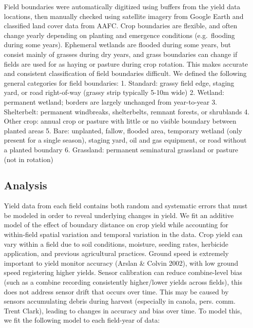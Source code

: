 \documentclass[]{elsarticle} %
\begin{document}
Field boundaries were automatically digitized using buffers from the yield data locations, then manually checked using satellite imagery from Google Earth and classified land cover data from AAFC.
Crop boundaries are flexible, and often change yearly depending on planting and emergence conditions (e.g.~flooding during some years).
Ephemeral wetlands are flooded during some years, but consist mainly of grasses during dry years, and grass boundaries can change if fields are used for as haying or pasture during crop rotation.
This makes accurate and consistent classification of field boundaries difficult.
We defined the following general categories for field boundaries:
1. Standard: grassy field edge, staging yard, or road right-of-way (grassy strip typically 5-10m wide)
2. Wetland: permanent wetland; borders are largely unchanged from year-to-year
3. Shelterbelt: permanent windbreaks, shelterbelts, remnant forests, or shrublands
4. Other crop: annual crop or pasture with little or no visible boundary between planted areas
5. Bare: unplanted, fallow, flooded area, temporary wetland (only present for a single season), staging yard, oil and gas equipment, or road without a planted boundary
6. Grassland: permanent seminatural grassland or pasture (not in rotation)

\hypertarget{analysis}{%
\subsection{Analysis}\label{analysis}}

Yield data from each field contains both random and systematic errors that must be modeled in order to reveal underlying changes in yield.
We fit an additive model of the effect of boundary distance on crop yield while accounting for within-field spatial variation and temporal variation in the data.
Crop yield can vary within a field due to soil conditions, moisture, seeding rates, herbicide application, and previous agricultural practices.
Ground speed is extremely important to yield monitor accuracy (Arslan \& Colvin 2002), with low ground speed registering higher yields.
Sensor calibration can reduce combine-level bias (such as a combine recording consistently higher/lower yields across fields), this does not address sensor drift that occurs over time.
This may be caused by sensors accumulating debris during harvest (especially in canola, pers. comm. Trent Clark), leading to changes in accuracy and bias over time.
To model this, we fit the following model to each field-year of data:
\end{document}

